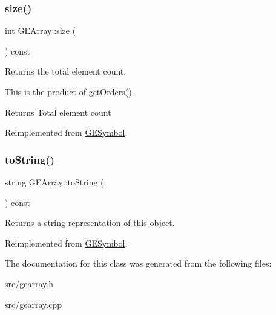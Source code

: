 \subsubsection{\texorpdfstring{size()}{size()}}
{\footnotesize\ttfamily int G\+E\+Array\+::size (\begin{DoxyParamCaption}{ }\end{DoxyParamCaption}) const\hspace{0.3cm}{\ttfamily [virtual]}}



Returns the total element count. 

This is the product of \hyperlink{class_g_e_array_a1a0335f73a61e044895f40a8dc89b4c6}{get\+Orders()}.

\begin{DoxyReturn}{Returns}
Total element count 
\end{DoxyReturn}


Reimplemented from \hyperlink{class_g_e_symbol_a534b11b49a640420aaca9433db0c6479}{G\+E\+Symbol}.

\mbox{\label{class_g_e_array_a9f5b44db0f65c13c2ac15dc119b81459}} 
\subsubsection{\texorpdfstring{to\+String()}{toString()}}
{\footnotesize\ttfamily string G\+E\+Array\+::to\+String (\begin{DoxyParamCaption}{ }\end{DoxyParamCaption}) const\hspace{0.3cm}{\ttfamily [virtual]}}



Returns a string representation of this object. 



Reimplemented from \hyperlink{class_g_e_symbol_a5c0d4c23b20574c28bddfe234409aa37}{G\+E\+Symbol}.



The documentation for this class was generated from the following files\+:\begin{DoxyCompactItemize}
\item 
src/gearray.\+h\item 
src/gearray.\+cpp\end{DoxyCompactItemize}
